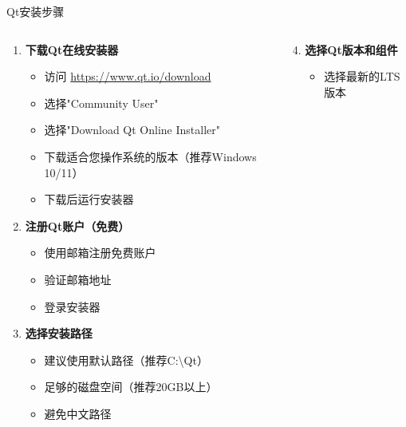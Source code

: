 \documentclass[UTF8,aspectratio=169]{beamer}
\begin{document}
\begin{frame}[fragile]{Qt安装步骤}
    \begin{columns}
        \begin{column}{0.48\textwidth}
            \begin{enumerate}
                \item \textbf{下载Qt在线安装器}
                    \begin{itemize}
                        \item 访问 \url{https://www.qt.io/download}
                        \item 选择"Community User"
                        \item 选择"Download Qt Online Installer"
                        \item 下载适合您操作系统的版本（推荐Windows 10/11）
                        \item 下载后运行安装器
                    \end{itemize}
                \item \textbf{注册Qt账户（免费）}
                    \begin{itemize}
                        \item 使用邮箱注册免费账户
                        \item 验证邮箱地址
                        \item 登录安装器
                    \end{itemize}
                \item \textbf{选择安装路径}
                    \begin{itemize}
                        \item 建议使用默认路径（推荐C:\textbackslash Qt）
                        \item 足够的磁盘空间（推荐20GB以上）
                        \item 避免中文路径
                    \end{itemize}
            \end{enumerate}
        \end{column}
        \begin{column}{0.48\textwidth}
            \begin{enumerate}
                \setcounter{enumi}{3}
                \item \textbf{选择Qt版本和组件}
                    \begin{itemize}
                        \item 选择最新的LTS版本

\end{itemize}
\end{enumerate}
\end{column}
\end{columns}
\end{frame}
\end{document}
